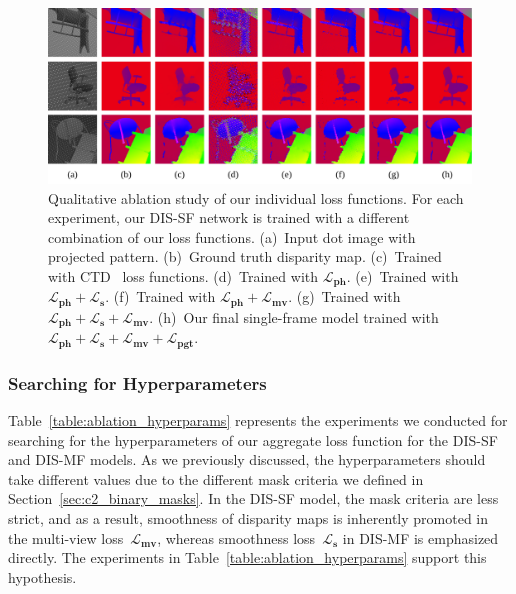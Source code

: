 \begin{figure}[t]
    \begin{center}
        \includegraphics[width=1\linewidth]{images/chapter2/supp_figures/ablation_loss.jpg}
    \end{center}
   \caption{Qualitative ablation study of our individual loss functions. For each experiment, our DIS-SF network is trained with a different combination of our loss functions. (a)~Input dot image with projected pattern. (b)~Ground truth disparity map. (c)~Trained with CTD~\citep{riegler2019connecting} loss functions. (d)~Trained with $\boldsymbol{\mathcal{L}_{ph}}$. (e)~Trained with $\boldsymbol{\mathcal{L}_{ph}} + \boldsymbol{\mathcal{L}_s}$. (f)~Trained with $\boldsymbol{\mathcal{L}_{ph}} + \boldsymbol{\mathcal{L}_{mv}}$. (g)~Trained with $\boldsymbol{\mathcal{L}_{ph}} + \boldsymbol{\mathcal{L}_s} + \boldsymbol{\mathcal{L}_{mv}}$. (h)~Our final single-frame model trained with $\boldsymbol{\mathcal{L}_{ph}} + \boldsymbol{\mathcal{L}_s} + \boldsymbol{\mathcal{L}_{mv}} + \boldsymbol{\mathcal{L}_{pgt}}$.}
    \label{fig:c2_ablation_loss}
\end{figure}

\subsubsection{Searching for Hyperparameters}
Table~\ref{table:ablation_hyperparams} represents the experiments we conducted for searching for the hyperparameters of our aggregate loss function for the DIS-SF and DIS-MF models. As we previously discussed, the hyperparameters should take different values due to the different mask criteria we defined in Section~\ref{sec:c2_binary_masks}. In the DIS-SF model, the mask criteria are less strict, and as a result, smoothness of disparity maps is inherently promoted in the multi-view loss~$\boldsymbol{\mathcal{L}_{mv}}$, whereas smoothness loss~$\boldsymbol{\mathcal{L}_{s}}$ in DIS-MF is emphasized directly. The experiments in Table~\ref{table:ablation_hyperparams} support this hypothesis.

